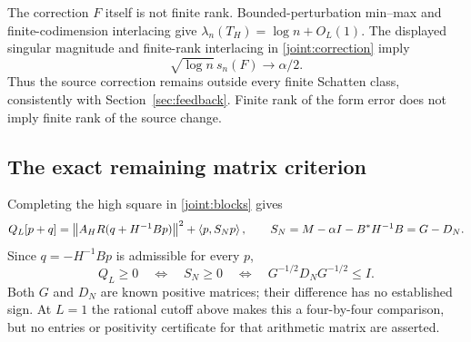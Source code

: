 The correction $F$ itself is not finite rank. Bounded-perturbation
min--max and finite-codimension interlacing give
$\lambda_n(T_H)=\log n+O_L(1)$.
The displayed singular magnitude and finite-rank interlacing in
\eqref{joint:correction} imply
\begin{equation}\label{joint:singular}
\sqrt{\log n}\,s_n(F)\longrightarrow\alpha/2.
\end{equation}
Thus the source correction remains outside every finite Schatten
class, consistently with Section~\ref{sec:feedback}. Finite rank
of the form error does not imply finite rank of the source change.

\subsection{The exact remaining matrix criterion}
Completing the high square in \eqref{joint:blocks} gives
\begin{equation}\label{joint:schur}
Q_L[p+q]=\left\lVert A_HR(q+H^{-1}Bp)\right\rVert^2+\left\langle p,S_Np\right\rangle,
\qquad
S_N=M-\alpha I-B^*H^{-1}B=G-D_N.
\end{equation}
Since $q=-H^{-1}Bp$ is admissible for every $p$,
\begin{equation}\label{joint:criterion}
Q_L\ge0\quad\Longleftrightarrow\quad S_N\ge0
\quad\Longleftrightarrow\quad G^{-1/2}D_NG^{-1/2}\le I.
\end{equation}
Both $G$ and $D_N$ are known positive matrices; their difference
has no established sign. At $L=1$ the rational cutoff above makes
this a four-by-four comparison, but no entries or positivity
certificate for that arithmetic matrix are asserted.

